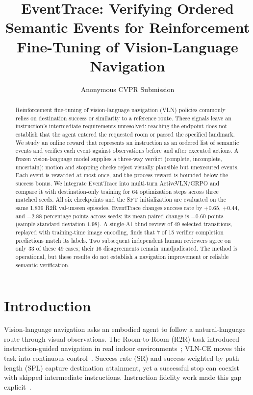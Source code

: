 \documentclass[10pt,twocolumn,letterpaper]{article}
\title{EventTrace: Verifying Ordered Semantic Events for Reinforcement Fine-Tuning of Vision-Language Navigation}
\author{Anonymous CVPR Submission}
\begin{document}
\maketitle

\begin{abstract}
Reinforcement fine-tuning of vision-language navigation (VLN) policies commonly relies on destination success or similarity to a reference route. These signals leave an instruction's intermediate requirements unresolved: reaching the endpoint does not establish that the agent entered the requested room or passed the specified landmark. We study an online reward that represents an instruction as an ordered list of semantic events and verifies each event against observations before and after executed actions. A frozen vision-language model supplies a three-way verdict (complete, incomplete, uncertain); motion and stopping checks reject visually plausible but unexecuted events. Each event is rewarded at most once, and the process reward is bounded below the success bonus. We integrate EventTrace into multi-turn ActiveVLN/GRPO and compare it with destination-only training for 64 optimization steps across three matched seeds. All six checkpoints and the SFT initialization are evaluated on the same 1,839 R2R val-unseen episodes. EventTrace changes success rate by $+0.65$, $+0.44$, and $-2.88$ percentage points across seeds; its mean paired change is $-0.60$ points (sample standard deviation $1.98$). A single-AI blind review of 49 selected transitions, replayed with training-time image encoding, finds that 7 of 15 verifier completion predictions match its labels. Two subsequent independent human reviewers agree on only 33 of these 49 cases; their 16 disagreements remain unadjudicated. The method is operational, but these results do not establish a navigation improvement or reliable semantic verification.
\end{abstract}

\section{Introduction}
Vision-language navigation asks an embodied agent to follow a natural-language route through visual observations. The Room-to-Room (R2R) task introduced instruction-guided navigation in real indoor environments~\cite{anderson2018r2r}; VLN-CE moves this task into continuous control~\cite{krantz2020vlnce}. Success rate (SR) and success weighted by path length (SPL) capture destination attainment, yet a successful stop can coexist with skipped intermediate instructions. Instruction fidelity work made this gap explicit~\cite{jain2019cls}.
\end{document}
